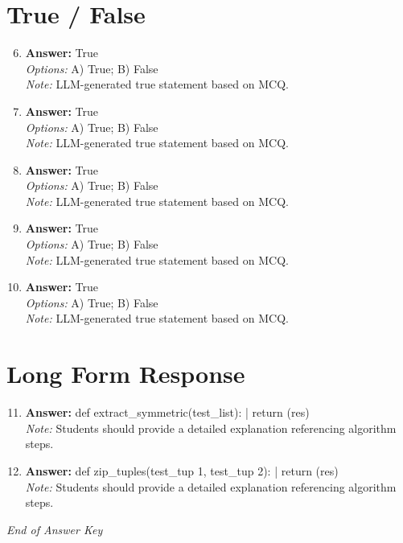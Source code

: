 \documentclass[12pt]{article}
\begin{document}
\section*{True / False}
\begin{enumerate}[label=\arabic*.]
\setcounter{enumi}{5}
\item \textbf{Answer:} True
\\ \textit{Options:} A) True; B) False
\\ \textit{Note:} LLM-generated true statement based on MCQ.
\item \textbf{Answer:} True
\\ \textit{Options:} A) True; B) False
\\ \textit{Note:} LLM-generated true statement based on MCQ.
\item \textbf{Answer:} True
\\ \textit{Options:} A) True; B) False
\\ \textit{Note:} LLM-generated true statement based on MCQ.
\item \textbf{Answer:} True
\\ \textit{Options:} A) True; B) False
\\ \textit{Note:} LLM-generated true statement based on MCQ.
\item \textbf{Answer:} True
\\ \textit{Options:} A) True; B) False
\\ \textit{Note:} LLM-generated true statement based on MCQ.
\end{enumerate}

\section*{Long Form Response}
\begin{enumerate}[label=\arabic*.]
\setcounter{enumi}{10}
\item \textbf{Answer:} def extract\_symmetric(test\_list): | return (res)
\\ \textit{Note:} Students should provide a detailed explanation referencing algorithm steps.
\item \textbf{Answer:} def zip\_tuples(test\_tup 1, test\_tup 2): | return (res)
\\ \textit{Note:} Students should provide a detailed explanation referencing algorithm steps.
\end{enumerate}

\vfill
\noindent\textit{End of Answer Key}
\end{document}
